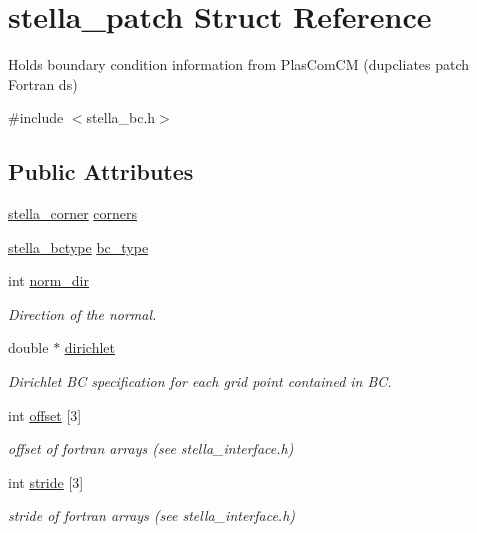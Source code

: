 \hypertarget{structstella__patch}{}\section{stella\+\_\+patch Struct Reference}
\label{structstella__patch}


Holds boundary condition information from Plas\+Com\+CM (dupcliates patch Fortran ds)  




{\ttfamily \#include $<$stella\+\_\+bc.\+h$>$}

\subsection*{Public Attributes}
\begin{DoxyCompactItemize}
\item 
\mbox{\hyperlink{structstella__corner}{stella\+\_\+corner}} \mbox{\hyperlink{structstella__patch_a1ec928943533a75b00a4a9f6d971e27f}{corners}}
\item 
\mbox{\hyperlink{stella__bc_8h_a7959afa0ee9aae02dd31cfce273269ce}{stella\+\_\+bctype}} \mbox{\hyperlink{structstella__patch_a78d598141e7d9910347ec3a2df8728f9}{bc\+\_\+type}}
\item 
int \mbox{\hyperlink{structstella__patch_a37a6c777f399d723635457e2c8b43d05}{norm\+\_\+dir}}
\begin{DoxyCompactList}\small\item\em Direction of the normal. \end{DoxyCompactList}\item 
double $\ast$ \mbox{\hyperlink{structstella__patch_a59abdfc4d88960997cbcef83708fc856}{dirichlet}}
\begin{DoxyCompactList}\small\item\em Dirichlet BC specification for each grid point contained in BC. \end{DoxyCompactList}\item 
int \mbox{\hyperlink{structstella__patch_aa339447fec0da1774027d1b07389c14a}{offset}} \mbox{[}3\mbox{]}
\begin{DoxyCompactList}\small\item\em offset of fortran arrays (see stella\+\_\+interface.\+h) \end{DoxyCompactList}\item 
int \mbox{\hyperlink{structstella__patch_ad5006aeed0381182eeb4ffd041c8332c}{stride}} \mbox{[}3\mbox{]}
\begin{DoxyCompactList}\small\item\em stride of fortran arrays (see stella\+\_\+interface.\+h) \end{DoxyCompactList}\end{DoxyCompactItemize}


